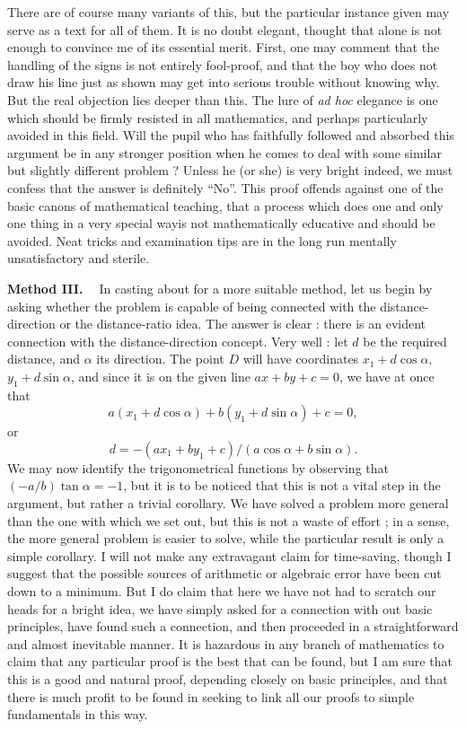 There are of course many variants of this, but the particular instance
given may serve as a text for all of them. It is no doubt elegant,
thought that alone is not enough to convince me of its essential
merit. First, one may comment that the handling of the signs is not
entirely fool-proof, and that the boy who does not draw his line just
as shown may get into serious trouble without knowing why. But the
real objection lies deeper than this. The lure of \textit{ad hoc}
elegance is one which should be firmly resisted in all mathematics,
and perhaps particularly avoided in this field. Will the pupil who has
faithfully followed and absorbed this argument be in any stronger
position when he comes to deal with some similar but slightly
different problem ? Unless he (or she) is very bright indeed, we must
confess that the answer is definitely ``No''. This proof offends
against one of the basic canons of mathematical teaching,  that a
process which does one and only one thing in a very special
way\pageoriginale is not mathematically educative and should be
avoided. Neat tricks and examination tips are in the long run mentally
unsatisfactory and sterile.

\medskip
\noindent
{\textbf{Method III. ~}} In casting about for a more suitable method,
let us begin by asking whether the problem is capable of being
connected with the distance-direction or the distance-ratio idea. The
answer is clear : there is an evident connection with the
distance-direction concept. Very well : let $d$ be the required
distance, and $\alpha$ its direction. The point $D$ will have
coordinates $x_1 + d \cos \alpha$, $y_1 + d \sin \alpha$, and since it
is on the given line $ax + by + c = 0$, we have at once that
$$
a(x_1 + d \cos \alpha) + b (y_1 + d \sin \alpha) + c = 0,
$$
or 
$$
d = - (ax_1 + by_1 + c) / (a \cos \alpha + b \sin \alpha).
$$
We may now identify the trigonometrical functions by observing that
$(-a/b) \tan \alpha = - 1$, but it is to be noticed that this is not a
vital step in the argument, but rather a trivial corollary. We have
solved a problem more general than the one with which we set out, but
this is not a waste of effort ; in a sense, the more general problem
is easier to solve, while the particular result is only a simple
corollary. I will not make any extravagant claim for time-saving,
though I suggest that the possible sources of arithmetic or algebraic
error have been cut down to a minimum. But I do claim that here we
have not had to scratch our heads for a bright idea, we have simply
asked for a connection with out basic principles, have found such a
connection, and then proceeded in a straightforward and almost
inevitable manner. It is hazardous in any branch of mathematics to
claim that any particular proof is the best that can be found, but I
am sure that this is a good and natural proof, depending closely on
basic principles, and that there is much profit to be found in seeking
to link all our proofs to simple fundamentals in this way.

